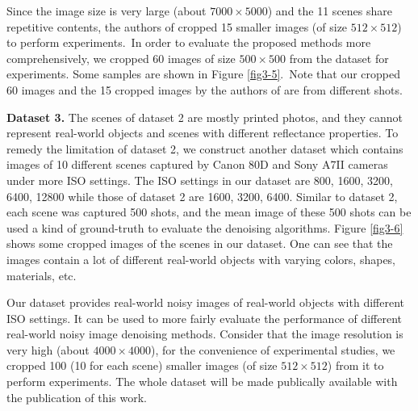 Since the image size is very large (about $7000\times5000$) and the 11 scenes share repetitive contents, the authors of \cite{crosschannel2016} cropped 15 smaller images (of size $512\times512$) to perform experiments.\ In order to evaluate the proposed methods more comprehensively, we cropped 60 images of size $500\times500$ from the dataset for experiments. Some samples are shown in Figure \ref{fig3-5}.\ Note that our cropped 60 images and the 15 cropped images by the authors of \cite{crosschannel2016} are from different shots.


\textbf{Dataset 3.} The scenes of dataset 2 are mostly printed photos, and they cannot represent real-world objects and scenes with different reflectance properties. To remedy the limitation of dataset 2, we construct another dataset which contains images of 10 different scenes captured by Canon 80D and Sony A7II cameras under more ISO settings. The ISO settings in our dataset are 800, 1600, 3200, 6400, 12800 while those of dataset 2 are 1600, 3200, 6400. Similar to dataset 2, each scene was captured 500 shots, and the mean image of these 500 shots can be used a kind of ground-truth to evaluate the denoising algorithms. Figure \ref{fig3-6} shows some cropped images of the scenes in our dataset. One can see that the images contain a lot of different real-world objects with varying colors, shapes, materials, etc. 

Our dataset provides real-world noisy images of real-world objects with different ISO settings. It can be used to more fairly evaluate the performance of different real-world noisy image denoising methods. Consider that the image resolution is very high (about $4000\times4000$), for the convenience of experimental studies, we cropped 100 (10 for each scene) smaller images (of size $512\times512$) from it to perform experiments. The whole dataset will be made publically available with the publication of this work.


